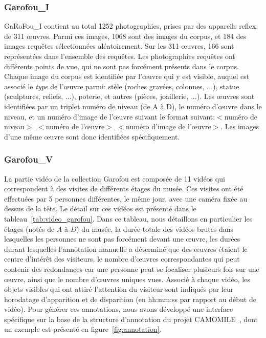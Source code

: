 \subsubsection{Garofou\_I}
\label{subsubsec:garoufoui}

GaRoFou\_I contient au total 1252 photographies, prises par des appareils reflex, de 311 œuvres. Parmi ces images, 1068 sont des images du corpus, et 184 des images requêtes sélectionnées aléatoirement. Sur les 311 œuvres, 166 sont représentées dans l'ensemble des requêtes. Les photographies requêtes ont différents points de vue, qui ne sont pas forcément présents dans le corpus. Chaque image du corpus est identifiée par l'œuvre qui y est visible, auquel est associé le {\it type} de l'œuvre parmi: stèle (roches gravées, colonnes, ...), statue (sculptures, reliefs, ...), poterie, et autres (pièces, joaillerie, ...). Les œuvres sont identifiées par un triplet numéro de niveau (de A à D), le numéro d'œuvre dans le niveau, et un numéro d'image de l'œuvre suivant le format suivant:$<$numéro de niveau$>$$\_$$<$numéro de l'œuvre$>$$\_$$<$numéro d'image de l'œuvre$>$. Les images d'une même œuvre sont donc identifiées spécifiquement. 

\subsubsection{Garofou\_V}
\label{subsubsec:garoufouv}

La partie vidéo de la collection Garofou est composée de 11 vidéos qui correspondent à des visites de différents étages du musée. Ces visites ont été effectuées par 5 personnes différentes, le même jour, avec une caméra fixée au dessus de la tête. Le détail sur ces vidéos est présenté dans le tableau~\ref{tab:video_garofou}. Dans ce tableau, nous détaillons en particulier les étages (notés de $A$ à $D$) du musée, la durée totale des vidéos brutes dans lesquelles les personnes ne sont pas forcément devant une œuvre, les durées durant lesquelles l'annotation manuelle a déterminé que des œuvres étaient le centre d'intérêt des visiteurs, le nombre d'œuvres correspondantes qui peut contenir des redondances car une personne peut se focaliser plusieurs fois sur une œuvre, ainsi que le nombre d'œuvres uniques vues.
Associé à chaque vidéo, les objets visibles qui ont attiré l'attention du visiteur sont indiqués par leur horodatage d'apparition et de disparition (en {hh:mm:ss} par rapport au début de vidéo). Pour générer ces annotations, nous avons développé une interface spécifique sur la base de la structure d'annotation du projet CAMOMILE~\cite{poignant2016lrec}, dont un exemple est présenté en figure~\ref{fig:annotation}.

